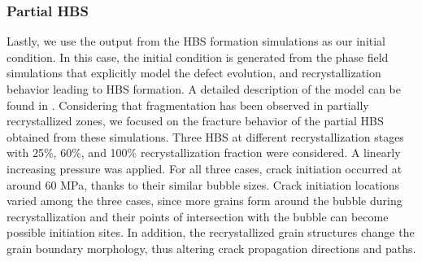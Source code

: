 \subsubsection{Partial HBS}

Lastly, we use the output from the HBS formation simulations as our initial condition. In this case, the initial condition is generated from the phase field simulations that explicitly model the defect evolution, and recrystallization behavior leading to HBS formation. A detailed description of the model can be found in \cite{Aagesen2020}. Considering that fragmentation has been observed in partially recrystallized zones, we focused on the fracture behavior of the partial HBS obtained from these simulations.
Three HBS at different recrystallization stages with 25$\%$, 60$\%$, and 100$\%$ recrystallization fraction were considered. A linearly increasing pressure was applied. For all three cases, crack initiation occurred at around 60 MPa, thanks to their similar bubble sizes. Crack initiation locations varied among the three cases, since more grains form around the bubble during recrystallization and their points of intersection with the bubble can become possible initiation sites. In addition, the recrystallized grain structures change the grain boundary morphology, thus altering crack propagation directions and paths.

